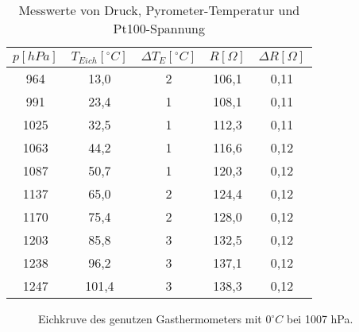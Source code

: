 \begin{table}[h!]   
    \centering
    \begin{tabular}{c | c | c | c | c}
        \textbf{$p [hPa]$} & \textbf{$T_{Eich} [^\circ C]$} & \textbf{$\Delta T_{E} [^\circ C]$} & \textbf{$R [\Omega]$} & \textbf{$\Delta R [\Omega]$} \\
        \hline
         964  & 13,0 & 2 & 106,1 & 0,11\\
         991  & 23,4 & 1 & 108,1 & 0,11\\
        1025  & 32,5 & 1 & 112,3 & 0,11\\
        1063  & 44,2 & 1 & 116,6 & 0,12\\
        1087  & 50,7 & 1 & 120,3 & 0,12\\
        1137  & 65,0 & 2 & 124,4 & 0,12\\
        1170  & 75,4 & 2 & 128,0 & 0,12\\
        1203  & 85,8 & 3 & 132,5 & 0,12\\
        1238  & 96,2 & 3 & 137,1 & 0,12\\
        1247  & 101,4 & 3 & 138,3 & 0,12\\
    \end{tabular}
    \label{tab:pt_100}
    \caption{Messwerte von Druck, Pyrometer-Temperatur und Pt100-Spannung}  
\end{table}

\onecolumn
\begin{figure}
    \caption{Eichkruve des genutzen Gasthermometers mit $0^\circ C$ bei 1007 hPa.}
    \label{fig:graphisch_temp_druck}
\end{figure}
\twocolumn